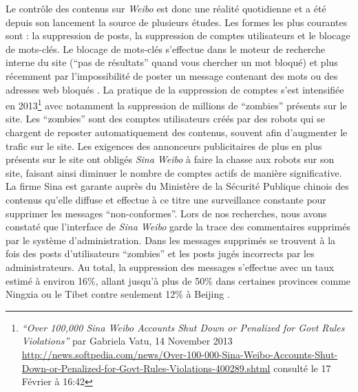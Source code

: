 Le contrôle des contenus sur \textit{Weibo} est donc une réalité quotidienne et a été depuis son lancement la source de plusieurs études. Les formes les plus courantes sont : la suppression de posts, la suppression de comptes utilisateurs et le blocage de mots-clés. Le blocage de mots-clés s’effectue dans le moteur de recherche interne du site (“pas de résultats” quand vous chercher un mot bloqué) et plus récemment par l’impossibilité de poster un message contenant des mots ou des adresses web bloqués \citep{Ng2013}. La pratique de la suppression de comptes s’est intensifiée en 2013\footnote{ \textit{“Over 100,000 \textit{Sina Weibo} Accounts Shut Down or Penalized for Govt Rules Violations”} par Gabriela Vatu, 14 November 2013 \url{http://news.softpedia.com/news/Over-100-000-Sina-Weibo-Accounts-Shut-Down-or-Penalized-for-Govt-Rules-Violations-400289.shtml} consulté le 17 Février à 16:42} avec notamment la suppression de millions de “zombies” présents sur le site. Les “zombies” sont des comptes utilisateurs créés par des robots qui se chargent de reposter automatiquement des contenus, souvent afin d’augmenter le trafic sur le site. Les exigences des annonceurs publicitaires de plus en plus présents sur le site ont obligés \textit{Sina Weibo} à faire la chasse aux robots sur son site, faisant ainsi diminuer le nombre de comptes actifs de manière significative. La firme Sina est garante auprès du Ministère de la Sécurité Publique chinois des contenus qu’elle diffuse et effectue à ce titre une surveillance constante pour supprimer les messages “non-conformes”. Lors de nos recherches, nous avons constaté que l’interface de \textit{Sina Weibo} garde la trace des commentaires supprimés par le système d’administration. Dans les messages supprimés se trouvent à la fois des posts d’utilisateurs “zombies” et les posts jugés incorrects par les administrateurs. Au total, la suppression des messages s’effectue avec un taux estimé à environ 16\%, allant jusqu’à plus de 50\% dans certaines provinces comme Ningxia ou le Tibet contre seulement 12\% à Beijing \citep{Bamman2012}.


